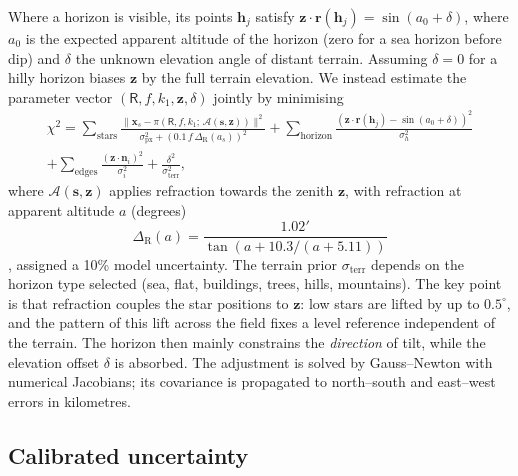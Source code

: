 \documentclass[11pt,a4paper]{article}
\newcommand{\z}{\bm{z}}
\newcommand{\n}{\bm{n}}
\newcommand{\R}{\mathsf{R}}
\begin{document}
Where a horizon is visible, its points $\bm{h}_j$ satisfy $\z\cdot\bm{r}(\bm{h}_j) = \sin(a_0+\delta)$, where $a_0$ is the expected apparent altitude of the horizon (zero for a sea horizon before dip) and $\delta$ the unknown elevation angle of distant terrain. Assuming $\delta=0$ for a hilly horizon biases $\z$ by the full terrain elevation. We instead estimate the parameter vector $(\R,f,k_1,\z,\delta)$ jointly by minimising
\begin{multline}
\chi^2 = \sum_{\text{stars}} \frac{\|\bm{x}_s - \pi(\R,f,k_1;\, \mathcal{A}(\bm{s},\z))\|^2}{\sigma_{\mathrm{px}}^2 + (0.1\,f\,\Delta_{\mathrm R}(a_s))^2}
+ \sum_{\text{horizon}} \frac{\left(\z\cdot\bm{r}(\bm{h}_j) - \sin(a_0+\delta)\right)^2}{\sigma_h^2} \\
+ \sum_{\text{edges}} \frac{(\z\cdot\n_i)^2}{\sigma_i^2}
+ \frac{\delta^2}{\sigma_{\mathrm{terr}}^2},
\label{eq:joint}
\end{multline}
where $\mathcal{A}(\bm{s},\z)$ applies refraction towards the zenith $\z$, with refraction at apparent altitude $a$ (degrees)
\begin{equation}
\Delta_{\mathrm R}(a) = \frac{1.02'}{\tan\left(a + 10.3/(a+5.11)\right)}
\end{equation}
 \citep{saemundsson1986,bennett1982}, assigned a 10\% model uncertainty. The terrain prior $\sigma_{\mathrm{terr}}$ depends on the horizon type selected (sea, flat, buildings, trees, hills, mountains). The key point is that refraction couples the star positions to $\z$: low stars are lifted by up to $0.5^\circ$, and the pattern of this lift across the field fixes a level reference independent of the terrain. The horizon then mainly constrains the \emph{direction} of tilt, while the elevation offset $\delta$ is absorbed. The adjustment is solved by Gauss--Newton with numerical Jacobians; its covariance is propagated to north--south and east--west errors in kilometres.

\subsection{Calibrated uncertainty}
\label{sec:uncert}
\end{document}
